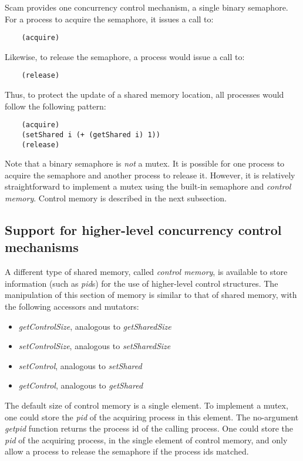 Scam provides one concurrency control mechanism, a single binary
semaphore. For a process to acquire the semaphore, it issues a call to:

\begin{verbatim}
    (acquire)
\end{verbatim}

Likewise, to release the semaphore, a process would issue a call to:

\begin{verbatim}
    (release)
\end{verbatim}

Thus, to protect the update of a shared memory location, all processes
would follow the following pattern:

\begin{verbatim}
    (acquire)
    (setShared i (+ (getShared i) 1))
    (release)
\end{verbatim}

Note that a binary semaphore is {\it not} a mutex. It is possible for
one process to acquire the semaphore and another process to release it.
However, it is relatively straightforward to implement a mutex using
the built-in semaphore and {\it control memory}.
Control memory is described in the next subsection.

\subsection{Support for higher-level concurrency control mechanisms}

A different type of shared memory, called {\it control memory},
is available to store
information (such as {\it pid}s) for the use of higher-level control
structures. The manipulation of this section of memory is similar to
that of shared memory, with the following accessors and mutators:

\begin{itemize}
\item
        {\it getControlSize}, analogous to {\it getSharedSize}
\item
        {\it setControlSize}, analogous to {\it setSharedSize}
\item
        {\it setControl}, analogous to {\it setShared}
\item
        {\it getControl}, analogous to {\it getShared}
\end{itemize}

The default size of control memory is a single element.
To implement a mutex, one could store the {\it pid} of the acquiring
process in this element.
The no-argument
{\it getpid} function returns the process id of the calling process.
One could store the {\it pid} of the acquiring process,
in the single element of control  memory, and only allow
a process to release the semaphore if the process ids matched.

